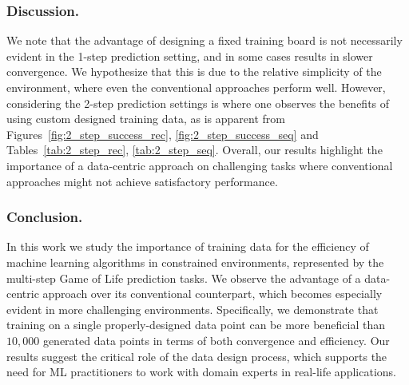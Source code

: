 \documentclass[letterpaper]{article} %
\begin{document}
\subsubsection{Discussion.}
We note that the advantage of designing a fixed training board is not necessarily evident in the 1-step prediction setting, and in some cases results in slower convergence.
We hypothesize that this is due to the relative simplicity of the environment, where even the conventional approaches perform well.
However, considering the 2-step prediction settings is where one observes the benefits of using custom designed training data, as is apparent from Figures~\ref{fig:2_step_success_rec}, \ref{fig:2_step_success_seq} and Tables~\ref{tab:2_step_rec}, \ref{tab:2_step_seq}.
Overall, our results highlight the importance of a data-centric approach on challenging tasks where conventional approaches might not achieve satisfactory performance.



\subsubsection{Conclusion.}
In this work we study the importance of training data for the efficiency of machine learning algorithms in constrained environments, represented by the multi-step Game of Life prediction tasks.
We observe the advantage of a data-centric approach over its conventional counterpart, which becomes especially evident in more challenging environments.
Specifically, we demonstrate that training on a single properly-designed data point can be more beneficial than $10,000$ generated data points in terms of both convergence and efficiency.
Our results suggest the critical role of the data design process, which supports the need for ML practitioners to work with domain experts in real-life applications.


\end{document}
